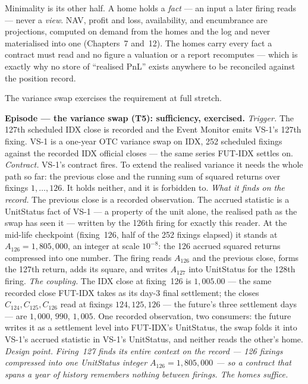 \documentclass[11pt,a4paper]{article}
\begin{document}
Minimality is its other half. A home holds a \emph{fact} --- an input a later firing reads
--- never a \emph{view}. NAV, profit and loss, availability, and encumbrance are
projections, computed on demand from the homes and the log and never materialised into one
(Chapters~7 and~12). The homes carry every fact a contract
must read and no figure a valuation or a report recomputes --- which is exactly why no
store of ``realised PnL'' exists anywhere to be reconciled against the position record.

The variance swap exercises the requirement at full stretch.

\medskip\noindent\textbf{Episode --- the variance swap (T5): sufficiency, exercised.}
\emph{Trigger.} The 127th scheduled IDX close is recorded and the Event Monitor emits
VS-1's 127th fixing. VS-1 is a one-year OTC variance swap on IDX, 252 scheduled fixings
against the recorded IDX official closes --- the same series FUT-IDX settles on.
\emph{Contract.} VS-1's contract fires. To extend the realised variance it needs the whole
path so far: the previous close and the running sum of squared returns over fixings
$1,\dots,126$. It holds neither, and it is forbidden to.
\emph{What it finds on the record.} The previous close is a recorded observation. The
accrued statistic is a UnitStatus fact of VS-1 --- a property of the unit alone, the
realised path as the swap has seen it --- written by the 126th firing for exactly this
reader. At the mid-life checkpoint (fixing~126, half of the 252 fixings elapsed) it stands
at $A_{126}=1{,}805{,}000$, an integer at scale $10^{-8}$: the 126 accrued squared returns
compressed into one number. The firing reads $A_{126}$ and the previous close, forms the
127th return, adds its square, and writes $A_{127}$ into UnitStatus for the 128th firing.
\emph{The coupling.} The IDX close at fixing~126 is $1{,}005.00$ --- the same recorded
close FUT-IDX takes as its day-3 final settlement; the closes $C_{124},C_{125},C_{126}$ read
at fixings $124,125,126$ --- the future's three settlement days --- are $1{,}000$, $990$, $1{,}005$. One recorded observation, two
consumers: the future writes it as a settlement level into FUT-IDX's UnitStatus, the swap
folds it into VS-1's accrued statistic in VS-1's UnitStatus, and neither reads the other's
home.
\emph{Design point.} \emph{Firing~127 finds its entire context on the record --- 126
fixings compressed into one UnitStatus integer $A_{126}=1{,}805{,}000$ --- so a contract
that spans a year of history remembers nothing between firings. The homes suffice.}
\end{document}
